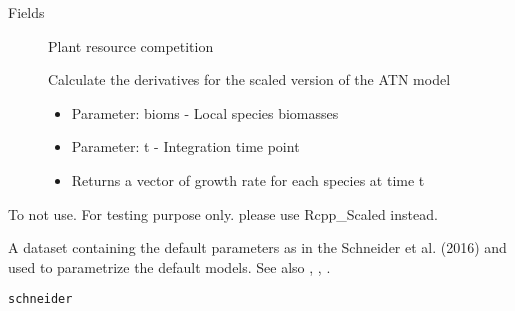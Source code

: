 \documentclass[letterpaper]{book}
\begin{document}
\begin{Section}{Fields}
\begin{description}
\item[] Plant resource competition

\item[] Calculate the derivatives for the scaled version of the ATN model \begin{itemize}

\item{} Parameter: bioms -  Local species biomasses
\item{} Parameter: t - Integration time point
\item{} Returns a vector of growth rate for each species at time t

\end{itemize}


\end{description}
\end{Section}
%
\begin{Description}\relax
To not use. For testing purpose only. please use Rcpp\_Scaled instead.
\end{Description}
%
\begin{Description}\relax
A dataset containing the default parameters as in the Schneider et al. (2016)
and used to parametrize the default models. See also
, ,
.
\end{Description}
%
\begin{Usage}
\begin{verbatim}
schneider
\end{verbatim}
\end{Usage}
%
\end{document}
